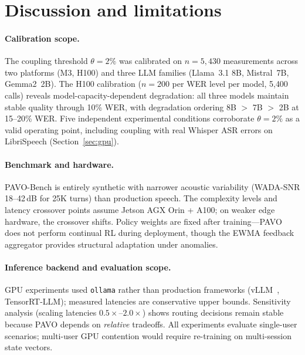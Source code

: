 \documentclass{article}
\begin{document}
\section{Discussion and limitations}
\label{sec:discussion}

\paragraph{Calibration scope.} The coupling threshold $\theta=2\%$ was calibrated on $n=5{,}430$ measurements across two platforms (M3, H100) and three LLM families (Llama~3.1 8B, Mistral~7B, Gemma2~2B). The H100 calibration ($n=200$ per WER level per model, 5{,}400 calls) reveals model-capacity-dependent degradation: all three models maintain stable quality through 10\% WER, with degradation ordering 8B $>$ 7B $>$ 2B at 15--20\% WER. Five independent experimental conditions corroborate $\theta=2\%$ as a valid operating point, including coupling with real Whisper ASR errors on LibriSpeech (Section~\ref{sec:gpu}).

\paragraph{Benchmark and hardware.} PAVO-Bench is entirely synthetic with narrower acoustic variability (WADA-SNR 18--42\,dB for 25K turns) than production speech. The complexity levels and latency crossover points assume Jetson AGX Orin + A100; on weaker edge hardware, the crossover shifts. Policy weights are fixed after training---PAVO does not perform continual RL during deployment, though the EWMA feedback aggregator provides structural adaptation under anomalies.

\paragraph{Inference backend and evaluation scope.} GPU experiments used \texttt{ollama} rather than production frameworks (vLLM~\citep{kwon2023vllm}, TensorRT-LLM); measured latencies are conservative upper bounds. Sensitivity analysis (scaling latencies $0.5\times$--$2.0\times$) shows routing decisions remain stable because PAVO depends on \emph{relative} tradeoffs. All experiments evaluate single-user scenarios; multi-user GPU contention would require re-training on multi-session state vectors.
\end{document}
